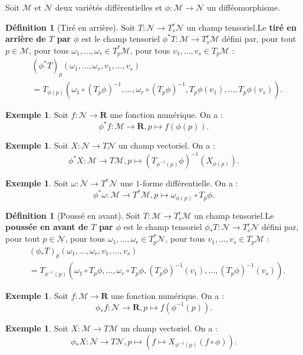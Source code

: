 \documentclass[12pt,a4paper]{article}
\theoremstyle{definition}
\newtheorem{defn}[thm]{Définition}
\newtheorem{ex}[thm]{Exemple}
\begin{document}
\medskip

Soit $\mathcal{M}$ et $\mathcal{N}$ deux variétés différentielles et $\phi:\mathcal{M}\to\mathcal{N}$ un difféomorphisme.
\begin{defn}[Tiré en arrière]
Soit $T:\mathcal{N}\to T^r_s\mathcal{N}$ un champ tensoriel.\newline Le \textbf{tiré en arrière de $T$ par $\phi$} est le champ tensoriel $\phi^*T:\mathcal{M}\to T^r_s\mathcal{M}$ défini par, pour tout $p\in\mathcal{M}$, pour tous $\omega_1,\ldots,\omega_r\in T_p^*\mathcal{M}$, pour tous $v_1,\ldots,v_s\in T_p\mathcal{M}$ :
\begin{align*}
&(\phi^*T)_p(\omega_1,\ldots,\omega_r,v_1,\ldots,v_s)\\&=T_{\phi(p)}(\omega_1\circ \left(T_p\phi\right)^{-1},\ldots,\omega_r\circ\left(T_p\phi\right)^{-1}, T_p\phi(v_1),\ldots, T_p\phi(v_s)).
\end{align*}
\end{defn}
\begin{ex}
Soit $f:\mathcal{N}\to\mathbf{R}$ une fonction numérique. On a :
$$\phi^*f:\mathcal{M}\to \mathbf{R},p\mapsto f(\phi(p)).$$
\end{ex}
\begin{ex}
Soit $X:\mathcal{N}\to T\mathcal{N}$ un champ vectoriel. On a :
$$
\phi^*X:\mathcal{M}\to T\mathcal{M},p\mapsto (T_{\phi^{-1}(p)}\phi)^{-1}(X_{\phi(p)}).
$$
\end{ex}
\begin{ex}
Soit $\omega:\mathcal{N}\to T^*\mathcal{N}$ une $1$-forme différentielle. On a :
$$\phi^*\omega:\mathcal{M}\to T^*\mathcal{M},p\mapsto \omega_{\phi(p)}\circ T_p\phi.$$
\end{ex}
\begin{defn}[Poussé en avant]
Soit $T:\mathcal{M}\to T^r_s\mathcal{M}$ un champ tensoriel.\newline Le \textbf{poussée en avant de $T$ par $\phi$} est le champ tensoriel $\phi_*T:\mathcal{N}\to T^r_s\mathcal{N}$ défini par, pour tout $p\in\mathcal{N}$, pour tous $\omega_1,\ldots,\omega_r\in T_p^*\mathcal{N}$, pour tous $v_1,\ldots,v_s\in T_p\mathcal{M}$ :
\begin{align*}
&(\phi_*T)_p(\omega_1,\ldots,\omega_r,v_1,\ldots,v_s)\\&=T_{\phi^{-1}(p)}(\omega_1\circ T_p\phi,\ldots,\omega_r\circ T_p\phi,(T_p\phi)^{-1}(v_1),\ldots,(T_p\phi)^{-1}(v_s)).
\end{align*}
\end{defn}
\begin{ex}
Soit $f:\mathcal{M}\to\mathbf{R}$ une fonction numérique. On a :
$$
\phi_*f:\mathcal{N}\to\mathbf{R},p\mapsto f(\phi^{-1}(p)).
$$
\end{ex}
\begin{ex}
Soit $X:\mathcal{M}\to T\mathcal{M}$ un champ vectoriel. On a :
$$
\phi_*X:\mathcal{N}\to T\mathcal{N},p\mapsto \left(f\mapsto X_{\phi^{-1}(p)}(f\circ\phi)\right).
$$
\end{ex}
\end{document}
